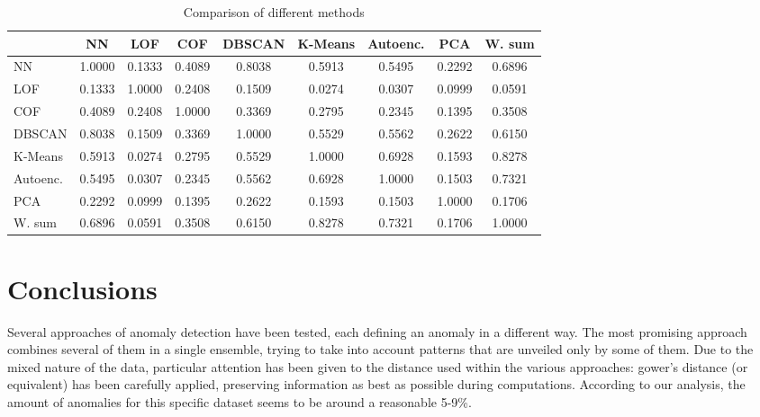 \documentclass[9pt,twocolumn]{article}
\begin{document}
\begin{table}[h]
    \centering
    \small
    \begin{adjustbox}{max width=.63\textwidth}
    \begin{tabular}{lcccccccc}
        & NN & LOF & COF & DBSCAN & K-Means & Autoenc. & PCA & W. sum \\
        \hline
        NN & 1.0000 & 0.1333 & 0.4089 & 0.8038 & 0.5913 & 0.5495 & 0.2292 & 0.6896 \\
        LOF & 0.1333 & 1.0000 & 0.2408 & 0.1509 & 0.0274 & 0.0307 & 0.0999 & 0.0591 \\
        COF & 0.4089 & 0.2408 & 1.0000 & 0.3369 & 0.2795 & 0.2345 & 0.1395 & 0.3508 \\
        DBSCAN & 0.8038 & 0.1509 & 0.3369 & 1.0000 & 0.5529 & 0.5562 & 0.2622 & 0.6150 \\
        K-Means & 0.5913 & 0.0274 & 0.2795 & 0.5529 & 1.0000 & 0.6928 & 0.1593 & 0.8278 \\
        Autoenc. & 0.5495 & 0.0307 & 0.2345 & 0.5562 & 0.6928 & 1.0000 & 0.1503 & 0.7321 \\
        PCA & 0.2292 & 0.0999 & 0.1395 & 0.2622 & 0.1593 & 0.1503 & 1.0000 & 0.1706 \\
        W. sum & 0.6896 & 0.0591 & 0.3508 & 0.6150 & 0.8278 & 0.7321 & 0.1706 & 1.0000 \\
    \end{tabular}
    \end{adjustbox}
    \caption{Comparison of different methods}
    \label{tab:comparison}
\end{table}

\section{Conclusions}
Several approaches of anomaly detection have been tested, each defining an anomaly in a different way. The most promising approach combines several of them in a single ensemble, trying to take into account patterns that are unveiled only by some of them. Due to the mixed nature of the data, particular attention has been given to the distance used within the various approaches: gower's distance (or equivalent) has been carefully applied, preserving information as best as possible during computations. According to our analysis, the amount of anomalies for this specific dataset seems to be around a reasonable 5-9\%.   


 
\end{document}
